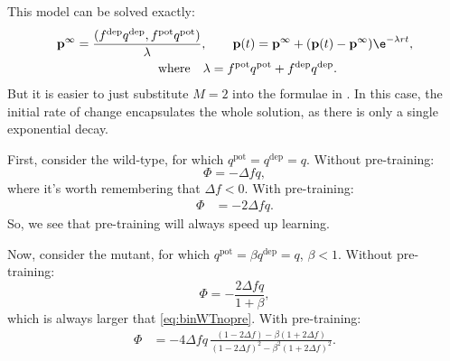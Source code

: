 \documentclass[12pt]{article}
\newcommand{\pr}{\mathbf{p}}
\newcommand{\eq}{\pr^\infty}
\newcommand{\pot}{^{\text{pot}}}
\newcommand{\dep}{^{\text{dep}}}
\begin{document}
This model can be solved exactly:
%
\begin{multline}\label{eq:binarysol}
  \eq = \frac{(f\dep q\dep, f\pot q\pot)}{\lambda},
  \qquad
  \pr(t) = \eq + (\pr(t)-\eq)\e^{-\lambda rt},\\
  \qquad \text{where} \quad
  \lambda = f\pot q\pot + f\dep q\dep.
\end{multline}
%
But it is easier to just substitute $M=2$ into the formulae in .
In this case, the initial rate of change encapsulates the whole solution, as there is only a single exponential decay.

First, consider the wild-type, for which $q\pot=q\dep=q$.
Without pre-training:
%
\begin{equation}\label{eq:binWTnopre}
  \Phi = -\Delta f q,
\end{equation}
%
where it's worth remembering that $\Delta f<0$.
With pre-training:
%
\begin{equation}\label{eq:binWTpre}
\begin{aligned}
  \Phi &= -2\Delta f q.
\end{aligned}
\end{equation}
%
So, we see that pre-training will always speed up learning.

Now, consider the mutant, for which $q\pot=\beta q\dep=q$, $\beta<1$.
Without pre-training:
%
\begin{equation}\label{eq:binKOnopre}
  \Phi = -\frac{2\Delta f q}{1+\beta},
\end{equation}
%
which is always larger that \eqref{eq:binWTnopre}.
With pre-training:
%
\begin{equation}\label{eq:binKOpre}
\begin{aligned}
  \Phi &= -4\Delta f q \, \frac{(1-2\Delta f) - \beta(1+2\Delta f)}
          {(1-2\Delta f)^2 - \beta^2(1+2\Delta f)^2}.
\end{aligned}
\end{equation}
%














\end{document}
